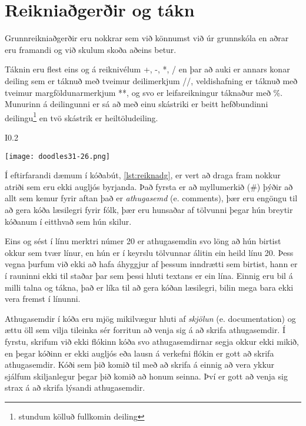 \section{Reikniaðgerðir og tákn}\label{uk:tolur-reiknivirkjar}
Grunnreikniaðgerðir eru nokkrar sem við könnumst við úr grunnskóla en aðrar eru framandi og við skulum skoða aðeins betur.

Táknin eru flest eins og á reiknivélum +, -, *, / en þar að auki er annars konar deiling sem er táknuð með tveimur deilimerkjum //, veldishafning er táknuð með tveimur margföldunarmerkjum **, og svo er leifareikningur táknaður með \%.
Munurinn á deilingunni er sá að með einu skástriki er beitt hefðbundinni deilingu\footnote{stundum kölluð fullkomin deiling} en tvö skástrik er heiltöludeiling.
\begin{wrapfigure}{I}{0.2\textwidth}
	\begin{center}
		\texttt{[image: doodles31-26.png]}
	\end{center}
\end{wrapfigure}

Í eftirfarandi dæmum í kóðabút, \ref{lst:reiknadg}, er vert að draga fram nokkur atriði sem eru ekki augljós byrjanda. 
Það fyrsta er að myllumerkið (\#) þýðir að allt sem kemur fyrir aftan það er \textit{athugasemd} (e. comments), þær eru engöngu til að gera kóða læsilegri fyrir fólk, þær eru hunsaðar af tölvunni þegar hún breytir kóðanum í eitthvað sem hún skilur.

Eins og sést í línu merktri númer 20 er athugasemdin svo löng að hún birtist okkur sem tvær línur, en hún er í keyrslu tölvunnar álitin ein heild línu 20.
Þess vegna þurfum við ekki að hafa áhyggjur af þessum inndrætti sem birtist, hann er í rauninni ekki til staðar þar sem þessi hluti textans er ein lína.
Einnig eru bil á milli talna og tákna, það er líka til að gera kóðan læsilegri, bilin mega bara ekki vera fremst í línunni.

Athugasemdir í kóða eru mjög mikilvægur hluti af \emph{skjölun} (e. documentation) og ættu öll sem vilja tileinka sér forritun að venja sig á að skrifa athugasemdir.
Í fyrstu, skrifum við ekki flókinn kóða svo athugasemdirnar segja okkur ekki mikið, en þegar kóðinn er ekki augljós eða lausn á verkefni flókin er gott að skrifa athugasemdir.
Kóði sem þið komið til með að skrifa á einnig að vera ykkur sjálfum skiljanlegur þegar þið komið að honum seinna.
Því er gott að venja sig strax á að skrifa lýsandi athugasemdir. 

